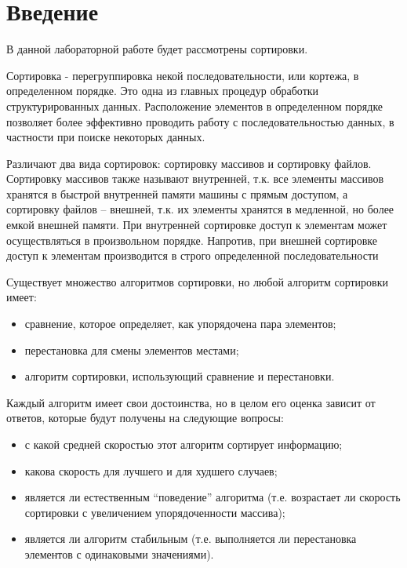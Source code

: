 \chapter*{Введение}

В данной лабораторной работе будет рассмотрены сортировки. 

Сортировка - перегруппировка некой последовательности, или кортежа, в определенном порядке. Это одна из главных процедур обработки структурированных данных. Расположение элементов в определенном порядке позволяет более эффективно проводить работу с последовательностью данных, в частности при поиске некоторых данных.

Различают два вида сортировок: сортировку массивов и сортировку файлов. Сортировку массивов также называют внутренней, т.к. все элементы массивов хранятся в быстрой внутренней памяти машины с прямым доступом, а сортировку файлов – внешней, т.к. их элементы хранятся в медленной, но более емкой внешней памяти. При внутренней сортировке доступ к элементам может осуществляться в
произвольном порядке. Напротив, при внешней сортировке доступ к элементам производится в строго определенной последовательности

Существует множество алгоритмов сортировки, но любой алгоритм сортировки имеет:
\begin{itemize}[label=---]
	\item сравнение, которое определяет, как упорядочена пара элементов;
	\item перестановка для смены элементов местами;
	\item алгоритм сортировки, использующий сравнение и перестановки.
\end{itemize}

Каждый алгоритм имеет свои достоинства, но в целом его оценка зависит от ответов, которые будут получены на следующие вопросы:
\begin{itemize}[label=---]
	\item с какой средней скоростью этот алгоритм сортирует информацию;
	\item какова скорость для лучшего и для худшего случаев;
	\item является ли естественным “поведение” алгоритма (т.е. возрастает ли скорость сортировки с увеличением упорядоченности массива);
	\item является ли алгоритм стабильным (т.е. выполняется ли перестановка элементов с одинаковыми значениями).
\end{itemize}

